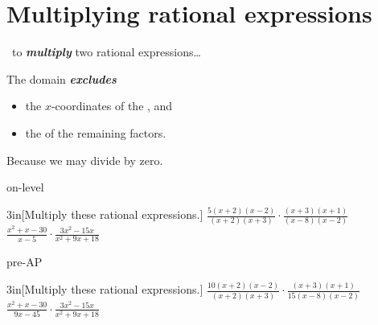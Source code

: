 \section{Multiplying rational expressions}

\begin{myConceptSteps}{~to {\bfseries\itshape multiply} two rational expressions\dots}
\end{myConceptSteps}

\begin{myCenteredBox}[width=4.25in,]
    The domain {\bfseries\itshape excludes}
    \begin{itemize}[nosep]
        \item the $x$-coordinates of the , and
        \item the  of the remaining factors.
    \end{itemize}
    \vspace{\onelineskip}
    Because we may  divide by zero.
\end{myCenteredBox}

\begin{taggedblock}{on-level}
    \begin{my2Problems}{3in}[Multiply these rational expressions.]
        {
            $
            \frac
            {5(x+2)(x-2)}
            {(x+2)(x+3)}
            \cdot
            \frac
            {(x+3)(x+1)}
            {(x-8)(x-2)}
            $
        }
        {
            $
            \frac
            {x^2 + x - 30}
            {x - 5}
            \cdot
            \frac
            {3x^2 - 15x}
            {x^2 + 9x + 18}
            $
        }
    \end{my2Problems}
\end{taggedblock}
\begin{taggedblock}{pre-AP}
    \begin{my2Problems}{3in}[Multiply these rational expressions.]
        {
            $
            \frac
            {10(x+2)(x-2)}
            {(x+2)(x+3)}
            \cdot
            \frac
            {(x+3)(x+1)}
            {15(x-8)(x-2)}
            $
        }
        {
            $
            \frac
            {x^2 + x - 30}
            {9x - 45}
            \cdot
            \frac
            {3x^2 - 15x}
            {x^2 + 9x + 18}
            $
        }
    \end{my2Problems}
\end{taggedblock}
